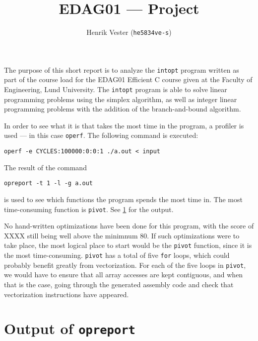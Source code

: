 \documentclass[a4paper,english]{article}
\title{EDAG01 --- Project}
\author{Henrik Vester (\texttt{he5834ve-s})}
\begin{document}
\maketitle

The purpose of this short report is to analyze the \texttt{intopt} program written as part of the course load for the EDAG01 Efficient C course given at the Faculty of Engineering, Lund University. The \texttt{intopt} program is able to solve linear programming problems using the simplex algorithm, as well as integer linear programming problems with the addition of the branch-and-bound algorithm.


In order to see what it is that takes the most time in the program, a profiler is used --- in this case \texttt{operf}. The following command is executed:

\begin{verbatim}
operf -e CYCLES:100000:0:0:1 ./a.out < input
\end{verbatim}

The result of the command

\begin{verbatim}
opreport -t 1 -l -g a.out
\end{verbatim}

is used to see which functions the program spends the most time in. The most time-consuming function is \texttt{pivot}. See \cref{section:opreport} for the output.



No hand-written optimizations have been done for this program, with the score of {\color{red}XXXX} still being well above the minimnum 80. If such optimizations were to take place, the most logical place to start would be the \texttt{pivot} function, since it is the most time-consuming. \texttt{pivot} has a total of five \texttt{for} loops, which could probably benefit greatly from vectorization. For each of the five loops in \texttt{pivot}, we would have to ensure that all array accesses are kept contiguous, and when that is the case, going through the generated assembly code and check that vectorization instructions have appeared.

\appendix

\section{Output of \texttt{opreport}}\label{section:opreport}
\end{document}
